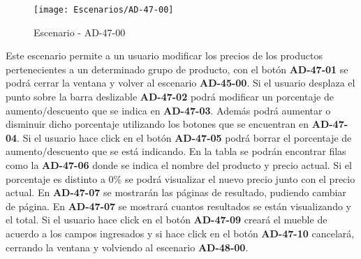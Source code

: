 \begin{figure}[H]
\centering
\texttt{[image: Escenarios/AD-47-00]}
\caption{Escenario - AD-47-00}
\label{fig:AD-47-00}
\end{figure}

Este escenario permite a un usuario modificar los precios de los productos pertenecientes a un determinado grupo de producto, con el botón \textbf{AD-47-01} se podrá cerrar la ventana y volver al escenario \textbf{AD-45-00}.
Si el usuario desplaza el punto sobre la barra deslizable \textbf{AD-47-02} podrá modificar un porcentaje de aumento/descuento que se indica en \textbf{AD-47-03}. Además podrá aumentar o disminuir dicho porcentaje utilizando los botones que se encuentran en \textbf{AD-47-04}. 
Si el usuario hace click en el botón \textbf{AD-47-05} podrá borrar el porcentaje de aumento/descuento que se está indicando. 
En la tabla se podrán encontrar filas como la \textbf{AD-47-06} donde se indica el nombre del producto y precio actual. Si el porcentaje es distinto a 0\% se podrá visualizar el nuevo precio junto con el precio actual. En  \textbf{AD-47-07} se mostrarán las páginas de resultado, pudiendo cambiar de página. En \textbf{AD-47-07} se mostrará cuantos resultados se están visualizando y el total.
Si el usuario hace click en el botón \textbf{AD-47-09} creará el mueble de acuerdo a los campos ingresados y si hace click en el botón \textbf{AD-47-10} cancelará, cerrando la ventana y volviendo al escenario \textbf{AD-48-00}.
\clearpage
